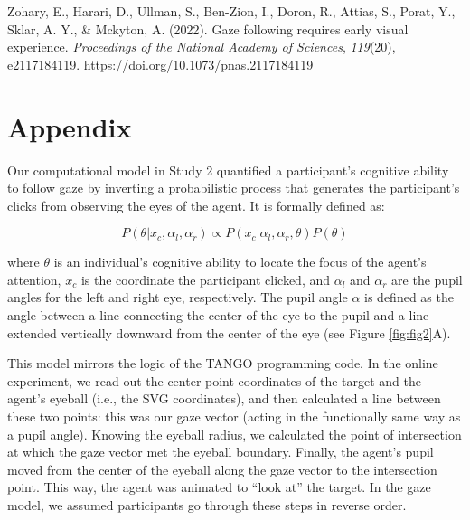 \documentclass[
  man,mask,floatsintext]{apa7}
\newlength{\cslhangindent}
\newlength{\cslentryspacingunit} %
\newenvironment{CSLReferences}[2] %
 {%
  \setlength{\parindent}{0pt}
  \ifodd #1
  \let\oldpar\par
  \def\par{\hangindent=\cslhangindent\oldpar}
  \fi
  \setlength{\parskip}{#2\cslentryspacingunit}
 }%
 {}
\begin{document}
\begin{CSLReferences}{1}{0}
\leavevmode{}%
Zohary, E., Harari, D., Ullman, S., Ben-Zion, I., Doron, R., Attias, S., Porat, Y., Sklar, A. Y., \& Mckyton, A. (2022). Gaze following requires early visual experience. \emph{Proceedings of the National Academy of Sciences}, \emph{119}(20), e2117184119. \url{https://doi.org/10.1073/pnas.2117184119}

\end{CSLReferences}

\endgroup

\newpage

\hypertarget{appendix}{%
\section{Appendix}\label{appendix}}

Our computational model in Study 2 quantified a participant's cognitive ability to follow gaze by inverting a probabilistic process that generates the participant's clicks from observing the eyes of the agent. It is formally defined as:

\begin{equation}
    P(\theta | x_c, \alpha_l, \alpha_r) \propto P(x_c | \alpha_l, \alpha_r, \theta)P(\theta)
\end{equation}

where \(\theta\) is an individual's cognitive ability to locate the focus of the agent's attention, \(x_c\) is the coordinate the participant clicked, and \(\alpha_l\) and \(\alpha_r\) are the pupil angles for the left and right eye, respectively. The pupil angle \(\alpha\) is defined as the angle between a line connecting the center of the eye to the pupil and a line extended vertically downward from the center of the eye (see Figure \ref{fig:fig2}A).

This model mirrors the logic of the TANGO programming code. In the online experiment, we read out the center point coordinates of the target and the agent's eyeball (i.e., the SVG coordinates), and then calculated a line between these two points: this was our gaze vector (acting in the functionally same way as a pupil angle). Knowing the eyeball radius, we calculated the point of intersection at which the gaze vector met the eyeball boundary. Finally, the agent's pupil moved from the center of the eyeball along the gaze vector to the intersection point. This way, the agent was animated to ``look at'' the target. In the gaze model, we assumed participants go through these steps in reverse order.
\end{document}
